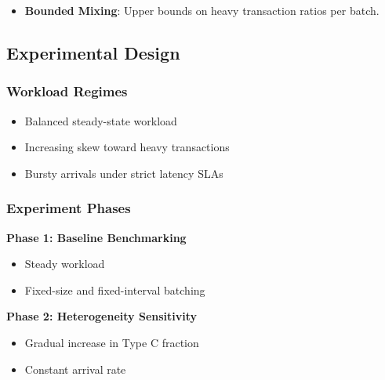 \begin{itemize}[leftmargin=1.5em]
The experiments are guided by three hypotheses. First, fixed-size or fixed-interval batching is expected to perform well under homogeneous workloads but degrade under heterogeneous transaction mixes because it does not adapt to transaction cost profiles. Second, soft-cap batching may improve robustness by avoiding data availability, proving, gas, or waiting-time thresholds, although it can leave some batch capacity unused. Third, transaction-aware or adaptive batching may improve latency and cost behavior when transaction classes differ significantly in data availability footprint or proof-delay contribution.
    
    \item \textbf{Bounded Mixing}: Upper bounds on heavy transaction ratios per batch.
\end{itemize}

\subsection{Experimental Design}

\subsubsection{Workload Regimes}

\begin{itemize}[leftmargin=1.5em]
    \item Balanced steady-state workload
    \item Increasing skew toward heavy transactions
    \item Bursty arrivals under strict latency SLAs
\end{itemize}

\subsubsection{Experiment Phases}

\textbf{Phase 1: Baseline Benchmarking}
\begin{itemize}
    \item Steady workload
    \item Fixed-size and fixed-interval batching
\end{itemize}

\textbf{Phase 2: Heterogeneity Sensitivity}
\begin{itemize}
    \item Gradual increase in Type C fraction
    \item Constant arrival rate
\end{itemize}

